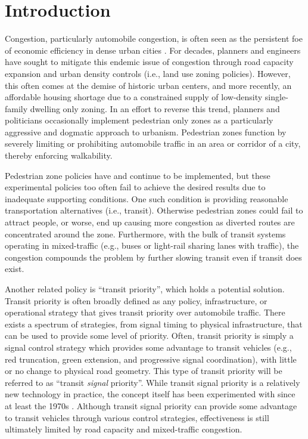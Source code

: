 \documentclass{elsarticle}\usepackage[]{graphicx}\usepackage[]{color}
\begin{document}

\linenumbers

\section{Introduction}
Congestion, particularly automobile congestion, is often seen as the persistent foe of economic efficiency in dense urban cities \citep{Solow1971,Solow1972,Solow1973,Anas1998,Anas1999,Wheaton1998,Rossi-Hansberg2004}. For decades, planners and engineers have sought to mitigate this endemic issue of congestion through road capacity expansion and urban density controls (i.e., land use zoning policies). However, this often comes at the demise of historic urban centers, and more recently, an affordable housing shortage due to a constrained supply of low-density single-family dwelling only zoning. In an effort to reverse this trend, planners and politicians occasionally implement pedestrian only zones as a particularly aggressive and dogmatic approach to urbanism. Pedestrian zones function by severely limiting or prohibiting automobile traffic in an area or corridor of a city, thereby enforcing walkability. 

Pedestrian zone policies have and continue to be implemented, but these experimental policies too often fail to achieve the desired results due to inadequate supporting conditions. One such condition is providing reasonable transportation alternatives (i.e., transit). Otherwise pedestrian zones could fail to attract people, or worse, end up causing more congestion as diverted routes are concentrated around the zone. Furthermore, with the bulk of transit systems operating in mixed-traffic (e.g., buses or light-rail sharing lanes with traffic), the congestion compounds the problem by further slowing transit even if transit does exist.

Another related policy is ``transit priority'', which holds a potential solution. Transit priority is often broadly defined as any policy, infrastructure, or operational strategy that gives transit priority over automobile traffic. There exists a spectrum of strategies, from signal timing to physical infrastructure, that can be used to provide some level of priority. Often, transit priority is simply a signal control strategy which provides some advantage to transit vehicles (e.g., red truncation, green extension, and progressive signal coordination), with little or no change to physical road geometry. This type of transit priority will be referred to as ``transit \emph{signal} priority''. While transit signal priority is a relatively new technology in practice, the concept itself has been experimented with since at least the 1970s \citep{Yagar1994,Yagar1993}. Although transit signal priority can provide some advantage to transit vehicles through various control strategies, effectiveness is still ultimately limited by road capacity and mixed-traffic congestion.
\end{document}
